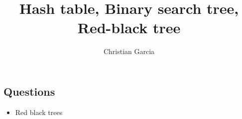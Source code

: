 \documentclass{article}
\title{Hash table, Binary search tree, Red-black tree}
\author{Christian Garcia}
\begin{document}
\maketitle

\begin{Huge}
\section*{Questions}
\end{Huge}
\begin{itemize}


\subsection{Create a hash table in Python, C, or C++. The hash table should have 4 functions at a minimum: insert(), search(), delete(), and a way to print out the hash table.}

\subsection{What is a hash function and why is it important to a hash table?}

\vspace{108pt}

\subsection{In what situations should we consider using a hash table?}
\pagebreak{}
\subsection{Create a binary search tree in one of the remaining two languages you did not use. The binary search tree should have 4 functions at a minimum: insert(), search(), delete(), and a way to print out the binary search tree.}
\item{Red black trees}
\end{itemize}
\end{document}
